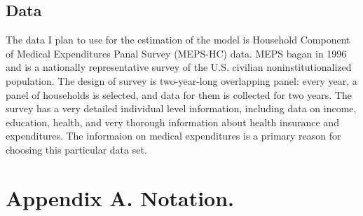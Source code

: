 \documentclass[
10pt, %
a4paper, %
oneside, %
headinclude,footinclude, %
BCOR5mm, %
]{scrartcl}
\begin{document}
\subsection{Data}
The data I plan to use for the estimation of the model is Household Component of Medical Expenditures Panal Survey (MEPS-HC) data. MEPS bagan in 1996 and is a nationally representative survey of the U.S. civilian noninstitutionalized population. The design of survey is two-year-long overlapping panel: every year, a panel of households is selected, and data for them is collected for two years. The survey has a very detailed individual level information, including data on income, education, health, and very thorough information about health insurance and expenditures. The informaion on medical expenditures is a primary reason for choosing this particular data set. 


\section{Appendix A. Notation.}
\end{document}
